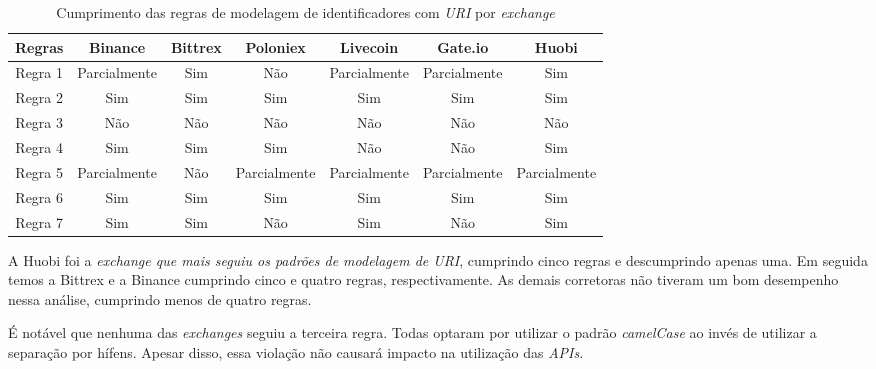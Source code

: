 \begin{table}[h]
    \centering
    \begin{tabular}{|c|c|c|c|c|c|c|}
        \hline
        \textbf{Regras} & \textbf{Binance} & \textbf{Bittrex} & \textbf{Poloniex} & \textbf{Livecoin} & \textbf{Gate.io} & \textbf{Huobi} \\ \hline
        Regra 1         & Parcialmente             & Sim                & Não                 & Parcialmente               & Parcialmente              & Sim             \\ \hline
        Regra 2         & Sim                & Sim                & Sim                 & Sim                 & Sim                & Sim              \\ \hline
        Regra 3         & Não                & Não                & Não                 & Não                 & Não                & Não              \\ \hline
        Regra 4         & Sim                & Sim                & Sim                 & Não                 & Não                & Sim              \\ \hline
        Regra 5         & Parcialmente              & Não                & Parcialmente               & Parcialmente               & Parcialmente              & Parcialmente            \\ \hline
        Regra 6         & Sim                & Sim                & Sim                 & Sim                 & Sim                & Sim              \\ \hline
        Regra 7         & Sim                & Sim                & Não                 & Sim                 & Não                & Sim              \\ \hline
    \end{tabular}
    \caption{Cumprimento das regras de modelagem de identificadores com \textit{URI} por \textit{exchange}}
    \label{tab:table-1}
\end{table}

A Huobi foi a \textit{exchange que mais seguiu os padrões de modelagem de \textit{URI}}, cumprindo cinco regras e descumprindo apenas uma. Em seguida temos a Bittrex e a Binance cumprindo cinco e quatro regras, respectivamente. As demais corretoras não tiveram um bom desempenho nessa análise, cumprindo menos de quatro regras.

É notável que nenhuma das \textit{exchanges} seguiu a terceira regra. Todas optaram por utilizar o padrão \textit{camelCase} ao invés de utilizar a separação por hífens. Apesar disso, essa violação não causará impacto na utilização das \textit{APIs}.

